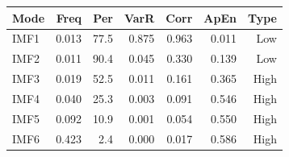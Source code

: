 {\tiny\setlength{\tabcolsep}{1pt}\begin{tabular}{lrrrrrr} \toprule
Mode & Freq & Per & VarR & Corr & ApEn & Type \\ \midrule
IMF1 & 0.013 & 77.5 & 0.875 & 0.963 & 0.011 & Low \\ 
IMF2 & 0.011 & 90.4 & 0.045 & 0.330 & 0.139 & Low \\ 
IMF3 & 0.019 & 52.5 & 0.011 & 0.161 & 0.365 & High \\ 
IMF4 & 0.040 & 25.3 & 0.003 & 0.091 & 0.546 & High \\ 
IMF5 & 0.092 & 10.9 & 0.001 & 0.054 & 0.550 & High \\ 
IMF6 & 0.423 & 2.4 & 0.000 & 0.017 & 0.586 & High \\ 
\bottomrule \end{tabular}}